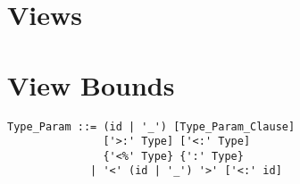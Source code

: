 \section{Views}
\label{sec:views}

\section{View Bounds}

\syntax\begin{lstlisting}
Type_Param ::= (id | '_') [Type_Param_Clause]
               ['>:' Type] ['<:' Type]
               {'<%' Type} {':' Type}
             | '<' (id | '_') '>' ['<:' id]
\end{lstlisting}


